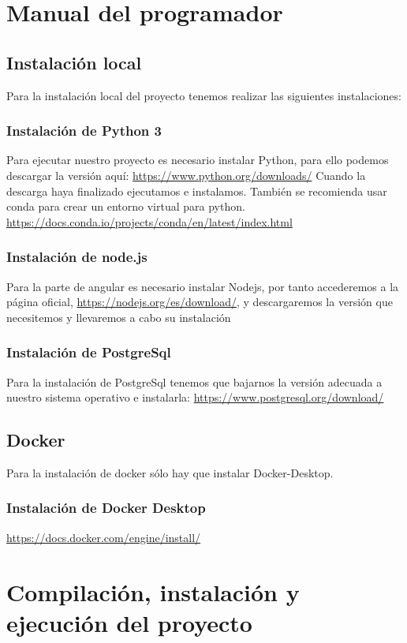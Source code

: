 \section{Manual del programador}

\subsection {Instalación local}
Para la instalación local del proyecto tenemos realizar las siguientes instalaciones:

\subsubsection {Instalación de Python 3 ~\cite{lutz2001programming}}
Para ejecutar nuestro proyecto es necesario instalar Python, para ello
podemos descargar la versión aquí: \url{https://www.python.org/downloads/}
Cuando la descarga haya finalizado ejecutamos e instalamos.
También se recomienda usar conda para crear un entorno virtual para python. 
\url{https://docs.conda.io/projects/conda/en/latest/index.html}

\subsubsection {Instalación de node.js}
Para la parte de angular es necesario instalar Nodejs, por tanto accederemos 
a la página oficial, \url{https://nodejs.org/es/download/}, 
y descargaremos la versión que necesitemos y llevaremos a cabo su instalación

\subsubsection {Instalación de PostgreSql}
Para la instalación de PostgreSql tenemos que bajarnos la versión adecuada a nuestro sistema operativo e instalarla:
\url{https://www.postgresql.org/download/}

\subsection {Docker}
Para la instalación de docker sólo hay que instalar Docker-Desktop.
\subsubsection {Instalación de Docker Desktop}
\url{https://docs.docker.com/engine/install/}

\section{Compilación, instalación y ejecución del proyecto}
